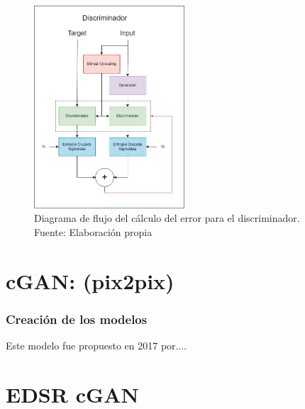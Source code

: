 \begin{figure}[H]
	\centering
	\includegraphics[width=0.5\textwidth]{figures/losses_GAN_Discriminador.png}
	\caption{\label{fig:gandiscloss}Diagrama de flujo del cálculo del error para el discriminador. Fuente: Elaboración propia}
\end{figure}


\section{cGAN: (pix2pix)}

\subsubsection{Creación de los modelos}

Este modelo fue propuesto en 2017 por....

\section{EDSR cGAN}